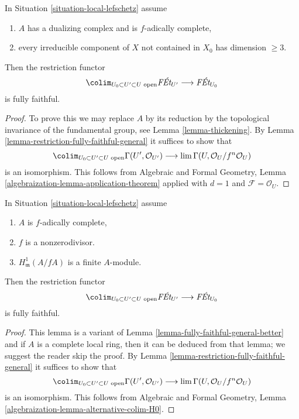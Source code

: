 \begin{lemma}
\label{lemma-fully-faithful-general-better}
In Situation \ref{situation-local-lefschetz} assume
\begin{enumerate}
\item $A$ has a dualizing complex and is $f$-adically complete,
\item every irreducible component of $X$ not contained in $X_0$
has dimension $\geq 3$.
\end{enumerate}
Then the restriction functor
$$
\colim_{U_0 \subset U' \subset U\text{ open}} \textit{F\'Et}_{U'}
\longrightarrow
\textit{F\'Et}_{U_0}
$$
is fully faithful.
\end{lemma}

\begin{proof}
To prove this we may replace $A$ by its reduction by the topological
invariance of the fundamental group, see Lemma \ref{lemma-thickening}.
By Lemma \ref{lemma-restriction-fully-faithful-general}
it suffices to show that
$$
\colim_{U_0 \subset U' \subset U\text{ open}} \Gamma(U', \mathcal{O}_{U'})
\longrightarrow
\lim \Gamma(U, \mathcal{O}_U/f^n\mathcal{O}_U)
$$
is an isomorphism. This follows from
Algebraic and Formal Geometry, Lemma
\ref{algebraization-lemma-application-theorem}
applied with $d = 1$ and $\mathcal{F} = \mathcal{O}_U$.
\end{proof}

\begin{lemma}
\label{lemma-fully-faithful-general}
In Situation \ref{situation-local-lefschetz} assume
\begin{enumerate}
\item $A$ is $f$-adically complete,
\item $f$ is a nonzerodivisor.
\item $H^1_\mathfrak m(A/fA)$ is a finite $A$-module.
\end{enumerate}
Then the restriction functor
$$
\colim_{U_0 \subset U' \subset U\text{ open}} \textit{F\'Et}_{U'}
\longrightarrow
\textit{F\'Et}_{U_0}
$$
is fully faithful.
\end{lemma}

\begin{proof}
This lemma is a variant of
Lemma \ref{lemma-fully-faithful-general-better}
and if $A$ is a complete local ring, then it can be deduced from that lemma;
we suggest the reader skip the proof.
By Lemma \ref{lemma-restriction-fully-faithful-general}
it suffices to show that
$$
\colim_{U_0 \subset U' \subset U\text{ open}} \Gamma(U', \mathcal{O}_{U'})
\longrightarrow
\lim \Gamma(U, \mathcal{O}_U/f^n\mathcal{O}_U)
$$
is an isomorphism. This follows from
Algebraic and Formal Geometry, Lemma
\ref{algebraization-lemma-alternative-colim-H0}.
\end{proof}









